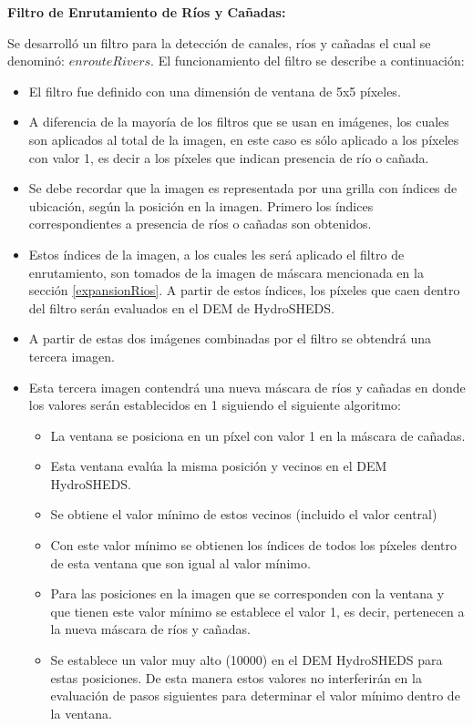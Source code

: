 \documentclass[10pt,a4paper, twoside]{report}
\begin{document}
\textbf{Filtro de Enrutamiento de Ríos y Cañadas:} 

Se desarrolló un filtro para la detección de canales, ríos y cañadas el cual se denominó: $enrouteRivers$. El funcionamiento del filtro se describe a continuación:

\begin{itemize}
	\item El filtro fue definido con una dimensión de ventana de 5x5 píxeles. 
	\item A diferencia de la mayoría de los filtros que se usan en imágenes, los cuales son aplicados al total de la imagen, en este caso es sólo aplicado a los píxeles con valor 1, es decir a los píxeles que indican presencia de río o cañada. 
	\item Se debe recordar que la imagen es representada por una grilla con índices de ubicación, según la posición en la imagen. Primero los índices correspondientes a presencia de ríos o cañadas son obtenidos.
	\item Estos índices de la imagen, a los cuales les será aplicado el filtro de enrutamiento, son tomados de la imagen de máscara mencionada en la sección \ref{expansionRios}. A partir de estos índices, los píxeles que caen dentro del filtro serán evaluados en el DEM de HydroSHEDS.
	\item A partir de estas dos imágenes combinadas por el filtro se obtendrá una tercera imagen.
	\item Esta tercera imagen contendrá una nueva máscara de ríos y cañadas en donde los valores serán establecidos en 1 siguiendo el siguiente algoritmo:	
	\begin{itemize}
		\item La ventana se posiciona en un píxel con valor 1 en la máscara de cañadas.
		\item Esta ventana evalúa la misma posición y vecinos en el DEM HydroSHEDS.
		\item Se obtiene el valor mínimo de estos vecinos (incluido el valor central)
		\item Con este valor mínimo se obtienen los índices de todos los píxeles dentro de esta ventana que son igual al valor mínimo.
		\item Para las posiciones en la imagen que se corresponden con la ventana y que tienen este valor mínimo se establece el valor 1, es decir, pertenecen a la nueva máscara de ríos y cañadas.
		\item Se establece un valor muy alto (10000) en el DEM HydroSHEDS para estas posiciones. De esta manera estos valores no interferirán en la evaluación de pasos siguientes para determinar el valor mínimo dentro de la ventana.
	\end{itemize}
\end{itemize}
\end{document}
